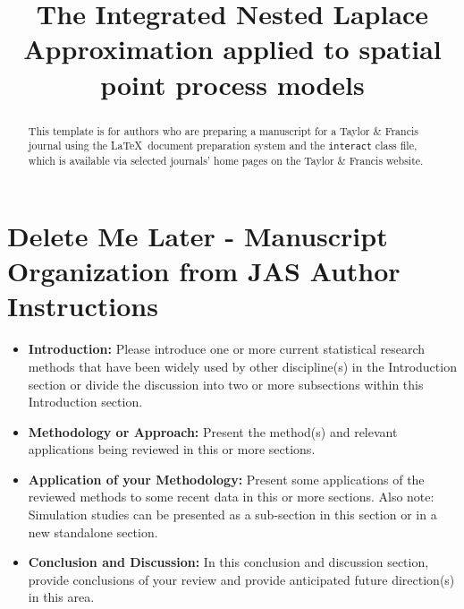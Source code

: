 \documentclass[]{interact}
\begin{document}

\title{The Integrated Nested Laplace Approximation applied to spatial point process models}

\author{
}

\maketitle

\begin{abstract}
This template is for authors who are preparing a manuscript for a Taylor \& Francis journal using the \LaTeX\ document preparation system and the \texttt{interact} class file, which is available via selected journals' home pages on the Taylor \& Francis website.
\end{abstract}

\begin{keywords}
\end{keywords}

\section*{Delete Me Later - Manuscript Organization from JAS Author Instructions}
\begin{itemize}

  \item {\bf Introduction:} Please introduce one or more current statistical research methods that have been widely used by other discipline(s) in the Introduction section or divide the discussion into two or more subsections within this Introduction section.
  \item {\bf Methodology or Approach:} Present the method(s) and relevant applications being reviewed in this or more sections.
  \item {\bf Application of your Methodology:} Present some applications of the reviewed methods to some recent data in this or more sections. Also note: Simulation studies can be presented as a sub-section in this section or in a new standalone section.
  \item {\bf Conclusion and Discussion:} In this conclusion and discussion section, provide conclusions of your review and provide anticipated future direction(s) in this area.
  \end{itemize}
\end{document}
